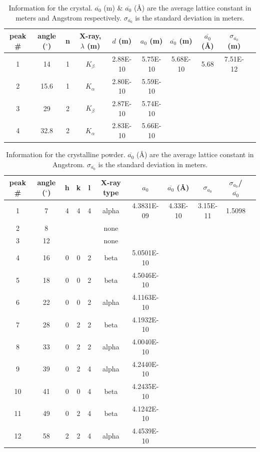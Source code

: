 \documentclass[a4paper,12pt,english]{all-in-one} %
\begin{document}
\begin{table}[]
\centering
\begin{tabular}{c|c|c|c|c|c|c|c|c|c}
peak \# & angle ($^\circ$) & n & X-ray, $\lambda$ (m) & $d$ (m) & $a_0$ (m) & $\overline{a_0}$ (m) & $\overline{a_0}$ (\AA) & $\sigma_{\overline{a_0}}$ (m)  \\ \hline
1 & 14 & 1 & $K_\beta$ & 2.88E-10 & 5.75E-10 & 5.68E-10 & 5.68 & 7.51E-12 \\
2 & 15.6 & 1 & $K_\alpha$ & 2.80E-10 & 5.59E-10 \\
3 & 29 & 2 & $K_\beta$ & 2.87E-10 & 5.74E-10\\
4 & 32.8 & 2 & $K_\alpha$ & 2.83E-10 & 5.66E-10 \\  
\end{tabular}
\caption{Information for the  crystal. $\overline{a_0}$ (m) \& $\overline{a_0}$ (\AA) are the average lattice constant in meters and Angstrom respectively. $\sigma_{\overline{a_0}}$ is the standard deviation in meters. }
\label{tab:NaCl}
\end{table}

\begin{table}[]
\centering
\begin{tabular}{c|c|c|c|c|c|c|c|c|c|c}
peak \# & angle ($^\circ$) & h & k & l & X-ray type & $a_0$ & $\overline{a_0}$ (\AA) & $\sigma_{a_0}$ & $\sigma_{a_0}$/$\overline{a_0}$  \\ \hline
1 & 7 & 4  & 4  & 4  & alpha & 4.3831E-09  & 4.33E-10 & 3.15E-11 & 1.5098\\
2 & 8 & & &   & none & & & & \\
3 & 12 & & &   & none & & & & \\
4 & 16 & 0 & 0 & 2 & beta & 5.0501E-10 & & & \\
5 & 18 & 0 & 0 & 2 & beta & 4.5046E-10 & & & \\
6 & 22 & 0 & 0 & 2 & alpha & 4.1163E-10 & & & \\
7 & 28 & 0 & 2 & 2 & beta & 4.1932E-10 & & & \\
8 & 33 & 0 & 2 & 2 & alpha & 4.0040E-10 & & & \\
9 & 39 & 0 & 2 & 4 & alpha & 4.2440E-10 & & & \\
10 & 41 & 0 & 0 & 4 & beta & 4.2435E-10 & & & \\
11 & 49 & 0 & 2 & 4 & beta & 4.1242E-10 & & & \\
12 & 58 & 2 & 2 & 4 & alpha & 4.4539E-10 & & &        
\end{tabular}
\caption{Information for the  crystalline powder. $\overline{a_0}$ (\AA) are the average lattice constant in Angstrom. $\sigma_{\overline{a_0}}$ is the standard deviation in meters.}
\label{tab:powder}
\end{table}
\end{document}
